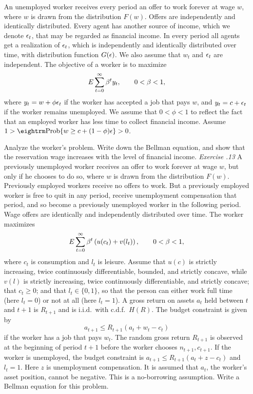 \medskip
{} 
\medskip
\noindent An unemployed worker receives every period an offer to work forever at wage
$w$, where $w$ is drawn from the distribution $F(w)$.  Offers are independently
and identically distributed.  Every agent has another source of income, which
we denote ${\epsilon}_t$, that may be regarded as financial income.  In every
period all agents get a realization of ${\epsilon}_t$, which is independently and
identically distributed over time, with distribution function $G({\epsilon})$.  We
also assume that $w_t$ and ${\epsilon}_t$ are independent.  The objective of a worker
is to maximize
$$E\sum_{t=0}^\infty {\beta}^t y_t,\qquad 0<{\beta} <1,$$
where $y_t=w+\phi{\epsilon}_t$ if the worker has accepted a job that pays $w$, and
$y_t=c+{\epsilon}_t$ if the worker remains unemployed.  We assume that $0<\phi<1$ to
reflect the fact that an employed worker has less time to collect financial income.  Assume $1>{\rm Prob}\{w\ge c+(1-\phi)\eps\}
>0$.

Analyze the worker's problem.  Write down the Bellman equation, and
show that the reservation wage increases with the level of financial income.
\medskip \noindent
{\it Exercise \the\chapternum.13}
\medskip
\noindent A previously unemployed worker receives an offer to work forever at wage $w$, but only if he chooses to do so, where
$w$ is drawn from the distribution $F(w)$.  Previously employed workers receive no offers to work.  But a previously employed  worker is free to quit in any period, receive unemployment compensation that period,
 and so become
a previously unemployed worker in the following period.    Wage offers are identically and
independently distributed over time.  The worker maximizes
$$E\sum_{t=0}^\infty {\beta}^t \left( u(c_t) + v(l_t) \right),\qquad 0<{\beta} <1,$$
where $c_t$ is consumption and $l_t$ is leisure. Assume that $u(c)$ is strictly increasing, twice continuously differentiable, bounded,
and strictly concave, while $v(l)$ is strictly increasing, twice continuously differentiable, and strictly concave;  that $c_t \geq 0$; and that $l_t  \in \{0,1\}$, so that the person can either
  work full time (here $l_t =0$) or not at all (here $l_t = 1$).
 A gross return on assets $a_t$  held
between $t$ and $t+1$  is $R_{t+1}$ and
is i.i.d.\ with
c.d.f.\  $H(R)$.  The budget constraint is given by
$$a_{t+1} \le R_{t+1} (a_t +w_t -c_t)$$
 if the worker has a job that pays $w_t$. The random gross return $R_{t+1}$ is observed at the beginning of period $t+1$ before
the worker chooses $n_{t+1}, c_{t+1}$.     If the worker is
unemployed, the budget constraint is $a_{t+1}\le R_{t+1} (a_t+z-c_t)$ and $l_t=1$.
Here $z$ is unemployment compensation.  It is assumed that  $a_t$, the worker's asset position, cannot be negative.
 This is a no-borrowing assumption.  Write a Bellman equation for
this problem.

